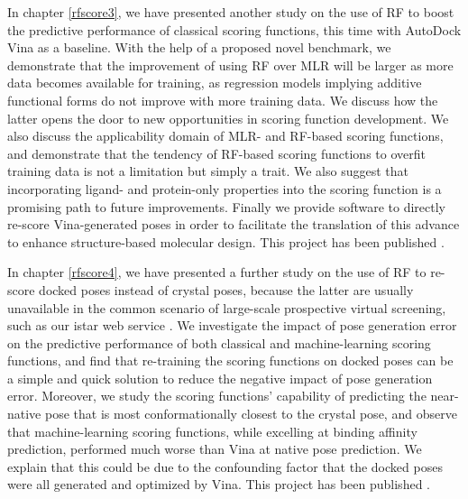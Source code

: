 In chapter \ref{rfscore3}, we have presented another study on the use of RF to boost the predictive performance of classical scoring functions, this time with AutoDock Vina \citep{595} as a baseline. With the help of a proposed novel benchmark, we demonstrate that the improvement of using RF over MLR will be larger as more data becomes available for training, as regression models implying additive functional forms do not improve with more training data. We discuss how the latter opens the door to new opportunities in scoring function development. We also discuss the applicability domain of MLR- and RF-based scoring functions, and demonstrate that the tendency of RF-based scoring functions to overfit training data is not a limitation but simply a trait. We also suggest that incorporating ligand- and protein-only properties into the scoring function is a promising path to future improvements. Finally we provide software to directly re-score Vina-generated poses in order to facilitate the translation of this advance to enhance structure-based molecular design. This project has been published \citep{1433}.

In chapter \ref{rfscore4}, we have presented a further study on the use of RF to re-score docked poses instead of crystal poses, because the latter are usually unavailable in the common scenario of large-scale prospective virtual screening, such as our istar web service \citep{1362}. We investigate the impact of pose generation error on the predictive performance of both classical and machine-learning scoring functions, and find that re-training the scoring functions on docked poses can be a simple and quick solution to reduce the negative impact of pose generation error. Moreover, we study the scoring functions' capability of predicting the near-native pose that is most conformationally closest to the crystal pose, and observe that machine-learning scoring functions, while excelling at binding affinity prediction, performed much worse than Vina at native pose prediction. We explain that this could be due to the confounding factor that the docked poses were all generated and optimized by Vina. This project has been published \citep{1434}.

